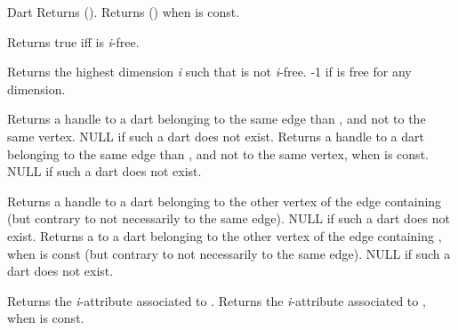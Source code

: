 \begin{ccRefConcept}{Dart}
         {Returns \betaiinv{}().
          }
\ccGlue
{}
         {Returns \betaiinv{}() when  is const.
          }

         {Returns true iff  is \emph{i}-free.
          }

         {Returns the highest dimension \emph{i} such that  is not \emph{i}-free.
          -1 if  is free for any dimension.}

         {Returns a handle to a dart belonging to the same edge 
          than , and not to the same vertex.
          NULL if such a dart does not exist.}
\ccGlue
{}
         {Returns a handle to a dart belonging to the same edge 
          than , and not to the same vertex, when  is const.
          NULL if such a dart does not exist.}

         {Returns a handle to a dart belonging to the other vertex of
          the edge containing  (but contrary to  not 
          necessarily to the same edge). NULL if such a dart does not exist.}
\ccGlue
{}
         {Returns a  to a dart belonging to the other vertex of
          the edge containing , when  is const (but contrary to
           not necessarily to the same edge). 
          NULL if such a dart does not exist.}


         {Returns the \emph{i}-attribute associated to .
           }
\ccGlue
{}
         {Returns the \emph{i}-attribute associated to ,
           when   is const.
           }


\end{ccRefConcept}

